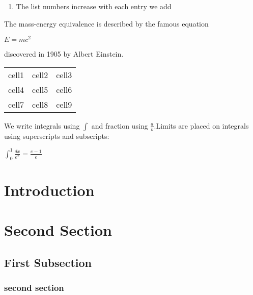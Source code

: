 \documentclass{article}
\begin{document}
\begin{center}
\begin{enumerate}
\item The list numbers increase with each entry we add
\end{enumerate}
\begin{flushleft}
The mass-energy equivalence is described by the famous equation
\end{flushleft}
\vspace{4mm}
$E=mc^2$
\begin{flushleft}
discovered in 1905 by Albert Einstein.
\end{flushleft}
\vspace{2mm}
\begin{tabular}{|c c c|}
\hline
cell1&cell2&cell3\\
cell4&cell5&cell6\\
cell7&cell8&cell9\\
\hline
\end{tabular}
\begin{flushleft}
We write integrals using $\int$ and fraction using $\frac{a}{b}$.Limits are placed on integrals\\ using superscripts and subscripts:
\vspace{3mm}
\end{flushleft}
\Large{$\int_0^1\frac{dx}{e^x}=\frac{e-1}{e}$}
\end{center}
\begin{flushleft}
\section{Introduction}
\section{Second Section}
\subsection{First Subsection}
\subsubsection{second section}
\end{flushleft}
\end{document}
